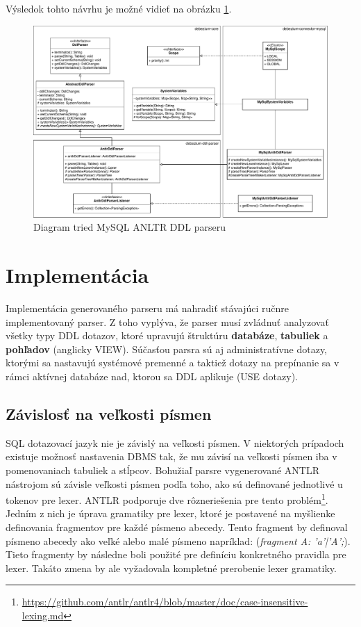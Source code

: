 Výsledok tohto návrhu je možné vidieť na obrázku \ref{fig:class_diagram_antlr}.
\begin{figure}[H]
\begin{center}
\includegraphics[width=15cm]{figures/antlr_design.pdf}
\caption{Diagram tried MySQL ANLTR DDL parseru}
\label{fig:class_diagram_antlr}
\end{center}
\end{figure}

\section{Implementácia}
Implementácia generovaného parseru má nahradiť stávajúci ručnre implementovaný parser. Z toho vyplýva, že parser musí zvládnuť analyzovať všetky typy DDL dotazov, ktoré upravujú štruktúru \textbf{databáze}, \textbf{tabuliek} a \textbf{pohľadov} (anglicky VIEW). Súčasťou parsra sú aj administratívne dotazy, ktorými sa nastavujú systémové premenné a taktiež dotazy na prepínanie sa v rámci aktívnej databáze nad, ktorou sa DDL aplikuje (USE dotazy).

\subsection{Závislosť na veľkosti písmen}
SQL dotazovací jazyk nie je závislý na veľkosti písmen. V niektorých prípadoch existuje možnosť nastavenia DBMS tak, že mu závisí na veľkosti písmen iba v pomenovaniach tabuliek a stĺpcov. Bohužiaľ parsre vygenerované ANTLR nástrojom sú závisle veľkosti písmen podľa toho, ako sú definované jednotlivé u tokenov pre lexer. ANTLR podporuje dve rôzneriešenia pre tento problém\footnote{\url{https://github.com/antlr/antlr4/blob/master/doc/case-insensitive-lexing.md}}. Jedním z nich je úprava gramatiky pre lexer, ktoré je postavené na myšlienke definovania fragmentov pre každé písmeno abecedy. Tento fragment by definoval písmeno abecedy ako veľké alebo malé písmeno napríklad: (\textit{fragment A: 'a'|'A';}). Tieto fragmenty by následne boli použité pre definíciu konkretného pravidla pre lexer. Takáto zmena by ale vyžadovala kompletné prerobenie lexer gramatiky.

